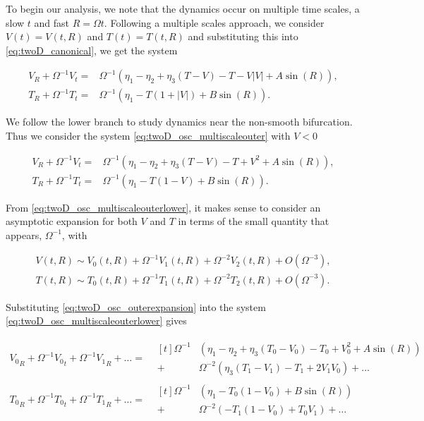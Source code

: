 To begin our analysis, we note that the dynamics occur on multiple time scales, a slow $t$ and fast $R = \Omega t$. Following a multiple scales approach, we consider $V(t)=V(t,R)$ and $T(t)=T(t,R)$ and substituting this into \eqref{eq:twoD_canonical}, we get the system

\begin{equation}\label{eq:twoD_osc_multiscaleouter}
\begin{aligned}
V_R+\Omega^{-1}V_t = & \Omega^{-1}\left(\eta_1-\eta_2+\eta_3(T-V)-T-V|V|+A\sin(R)\right),\\
T_R+\Omega^{-1}T_t = & \Omega^{-1}\left(\eta_1-T(1+|V|)+B\sin(R)\right).
\end{aligned}
\end{equation}

We follow the lower branch to study dynamics near the non-smooth bifurcation. Thus we consider the system \eqref{eq:twoD_osc_multiscaleouter} with $V<0$

\begin{equation}\label{eq:twoD_osc_multiscaleouterlower}
\begin{aligned}
V_R+\Omega^{-1}V_t = & \Omega^{-1}\left(\eta_1-\eta_2+\eta_3(T-V)-T+V^2+A\sin(R)\right),\\
T_R+\Omega^{-1}T_t = & \Omega^{-1}\left(\eta_1-T(1-V)+B\sin(R)\right).
\end{aligned}
\end{equation}

From \eqref{eq:twoD_osc_multiscaleouterlower}, it makes sense to consider an asymptotic expansion for both $V$ and $T$ in terms of the small quantity that appears, $\Omega^{-1}$, with

\begin{equation}\label{eq:twoD_osc_outerexpansion}
\begin{aligned}
V(t,R)\sim V_0(t,R) +\Omega^{-1}V_1(t,R) +\Omega^{-2}V_2(t,R)+O(\Omega^{-3}),\\
T(t,R)\sim T_0(t,R) +\Omega^{-1}T_1(t,R) +\Omega^{-2}T_2(t,R)+O(\Omega^{-3}).
\end{aligned}
\end{equation}

Substituting \eqref{eq:twoD_osc_outerexpansion} into the system \eqref{eq:twoD_osc_multiscaleouterlower} gives

\begin{equation*}
\begin{aligned}
{V_0}_R+\Omega^{-1}{V_0}_t+\Omega^{-1}{V_1}_R+\ldots=&\begin{aligned}[t]\Omega^{-1}&(\eta_1-\eta_2+\eta_3(T_0-V_0)-T_0+V_0^2+A\sin(R))\\
+&\Omega^{-2}(\eta_3(T_1-V_1)-T_1+2V_1V_0)+\ldots
\end{aligned}\\
{T_0}_R+\Omega^{-1}{T_0}_t+\Omega^{-1}{T_1}_R+\ldots=&\begin{aligned}[t] \Omega^{-1}&(\eta_1-T_0(1-V_0)+B\sin(R))\\
+&\Omega^{-2}(-T_1(1-V_0)+T_0V_1)+\ldots
\end{aligned}
\end{aligned}
\end{equation*}

